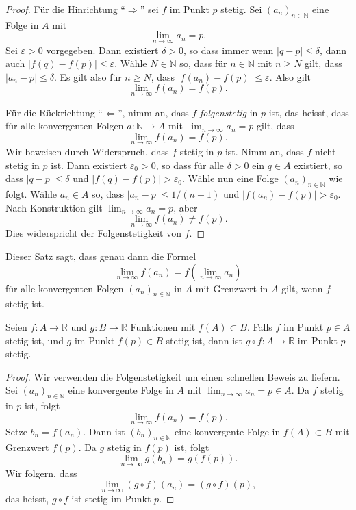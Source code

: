 \documentclass[../main.tex]{subfiles}
\begin{document}
\begin{proof}
  Für die Hinrichtung ``$\Rightarrow$'' sei $f$
  im Punkt $p$ stetig. Sei ${(a_{n})}_{n \in \mathbb{N}}$ 
  eine Folge in $A$ mit
  \[
    \lim_{n \to \infty} a_n = p.
  \]
  Sei $\varepsilon > 0$ vorgegeben.
  Dann existiert $\delta > 0$, so dass immer wenn
  $|q - p| \leq \delta$, dann auch
  $|f(q) - f(p)| \leq \varepsilon$.
  Wähle $N \in \mathbb{N}$ so,
  dass für $n \in \mathbb{N}$ mit $n \geq N$ gilt,
  dass $|a_n - p| \leq \delta$.
  Es gilt also für $n \geq N$, dass
  $|f(a_n) - f(p)| \leq \varepsilon$.
  Also gilt
  \[
    \lim_{n \to \infty} f(a_n) = f(p).
  \]
  
  Für die Rückrichtung ``$\Leftarrow$'', nimm an,
  dass $f$ \emph{folgenstetig} in $p$ ist,
  das heisst, dass für alle
  konvergenten Folgen $a \colon \mathbb{N} \to A$
  mit $\lim_{n \to \infty} a_n = p$ gilt,
  dass
  \[
    \lim_{n \to \infty} f(a_n) = f(p).
  \]
  Wir beweisen durch Widerspruch, dass
  $f$ stetig in $p$ ist.
  Nimm an, dass $f$ nicht stetig in $p$ ist.
  Dann existiert $\varepsilon_0 > 0$, so dass
  für alle $\delta > 0$ ein $q \in A$ 
  existiert, so dass
  $|q - p| \leq \delta$ und $|f(q) - f(p)| > \varepsilon_0$.
  Wähle nun eine Folge
  ${(a_{n})}_{n \in \mathbb{N}}$ wie folgt.
  Wähle $a_n \in A$ so, dass
  $|a_n - p| \leq 1/(n+1)$ und $|f(a_n) - f(p)| > \varepsilon_0$.
  Nach Konstruktion gilt
  $\lim_{n \to \infty} a_n = p$, aber
  \[
    \lim_{n \to \infty} f(a_n) \neq f(p).
  \]
  Dies widerspricht der Folgenstetigkeit von $f$.
\end{proof}

Dieser Satz sagt, dass genau dann die Formel
\[
  \lim_{n \to \infty}  f(a_n) = f\left(\lim_{n \to \infty} a_n\right)
\]
für alle konvergenten Folgen ${(a_{n})}_{n \in \mathbb{N}}$ in $A$
mit Grenzwert in $A$
gilt, wenn $f$ stetig ist.

\begin{application}
  Seien $f \colon A \to \mathbb{R}$ und $g \colon B \to \mathbb{R}$
  Funktionen mit $f(A) \subset B$. Falls $f$ im Punkt $p \in A$ 
  stetig ist, und $g$ im Punkt $f(p) \in B$ stetig ist,
  dann ist $g \circ f\colon A \to \mathbb{R}$ im Punkt $p$ stetig.
\end{application}

\begin{proof}
  Wir verwenden die Folgenstetigkeit um einen schnellen
  Beweis zu liefern.
  Sei  ${(a_{n})}_{n \in \mathbb{N}}$ eine konvergente
  Folge in $A$ mit $\lim_{n \to \infty} a_n = p \in A$.
  Da $f$ stetig in $p$ ist, folgt
  \[
    \lim_{n \to \infty}f(a_n) = f(p).
  \]
  Setze $b_n = f(a_n)$. Dann ist ${(b_{n})}_{n \in \mathbb{N}}$ 
  eine konvergente Folge in $f(A) \subset B$ mit Grenzwert
  $f(p)$.
  Da $g$ stetig in $f(p)$ ist, folgt
  \[
    \lim_{n \to \infty} g(b_n) = g(f(p)).
  \]
  Wir folgern, dass
  \[
    \lim_{n \to \infty} (g \circ f)(a_n) = (g \circ f)(p),
  \]
  das heisst, $g \circ f$ ist stetig im Punkt $p$.
\end{proof}
\end{document}
